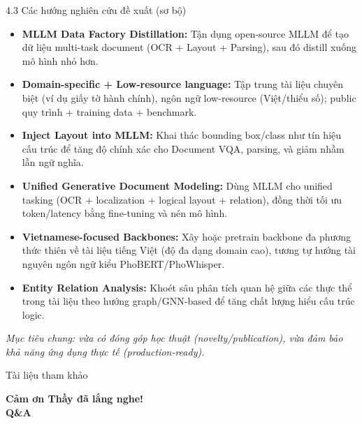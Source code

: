 \documentclass[aspectratio=1610,8pt]{beamer}
\begin{document}
\begin{frame}{4.3 \; Các hướng nghiên cứu đề xuất (sơ bộ)}
    \begin{itemize}
        \item \textbf{MLLM \textrightarrow{} Data Factory \textrightarrow{} Distillation:} Tận dụng open-source MLLM để tạo dữ liệu multi-task document (OCR + Layout + Parsing), sau đó distill xuống mô hình nhỏ hơn.
        \item \textbf{Domain-specific + Low-resource language:} Tập trung tài liệu chuyên biệt (ví dụ giấy tờ hành chính), ngôn ngữ low-resource (Việt/thiểu số); public quy trình + training data + benchmark.
        \item \textbf{Inject Layout into MLLM:} Khai thác bounding box/class như tín hiệu cấu trúc để tăng độ chính xác cho Document VQA, parsing, và giảm nhầm lẫn ngữ nghĩa.
        \item \textbf{Unified Generative Document Modeling:} Dùng MLLM cho unified tasking (OCR + localization + logical layout + relation), đồng thời tối ưu token/latency bằng fine-tuning và nén mô hình.
        \item \textbf{Vietnamese-focused Backbones:} Xây hoặc pretrain backbone đa phương thức thiên về tài liệu tiếng Việt (độ đa dạng domain cao), tương tự hướng tài nguyên ngôn ngữ kiểu PhoBERT/PhoWhisper.
        \item \textbf{Entity Relation Analysis:} Khoét sâu phân tích quan hệ giữa các thực thể trong tài liệu theo hướng graph/GNN-based để tăng chất lượng hiểu cấu trúc logic.
    \end{itemize}
        \vspace{0.3em}
        	\textit{Mục tiêu chung: vừa có đóng góp học thuật (novelty/publication), vừa đảm bảo khả năng ứng dụng thực tế (production-ready).}
\end{frame}

\begin{frame}[allowframebreaks]{Tài liệu tham khảo}
    \printbibliography
\end{frame}

\begin{frame}[plain]
    \centering
    \Huge{\textbf{\textcolor{primaryblue}{Cảm ơn Thầy đã lắng nghe!}}}\\
    \vspace{1cm}
    \Large{\textbf{Q\&A}}
\end{frame}
\end{document}
